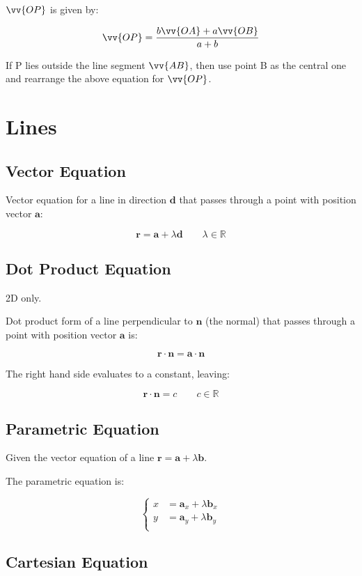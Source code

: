 \documentclass[a4paper,11pt]{article}
\newcommand{\bb}{\boldsymbol}
\begin{document}
$\vv{OP}$ is given by:

$$
\vv{OP} = \frac{b\vv{OA} + a\vv{OB}}{a + b}
$$

If P lies outside the line segment $\vv{AB}$, then use point B as the central
one and rearrange the above equation for $\vv{OP}$.




\section{Lines}

\subsection{Vector Equation}

Vector equation for a line in direction $\bb{d}$ that passes through a point
with position vector $\bb{a}$:

$$
\bb{r} = \bb{a} + \lambda \bb{d} \qquad \lambda \in \mathbb{R}
$$


\subsection{Dot Product Equation}

2D only.

Dot product form of a line perpendicular to $\bb{n}$ (the normal) that passes
through a point with position vector $\bb{a}$ is:

$$
\bb{r} \cdot \bb{n} = \bb{a} \cdot \bb{n}
$$

The right hand side evaluates to a constant, leaving:

$$
\bb{r} \cdot \bb{n} = c \qquad c \in \mathbb{R}
$$


\subsection{Parametric Equation}

Given the vector equation of a line $\bb{r} = \bb{a} + \lambda \bb{b}$.

The parametric equation is:

$$
\begin{cases}
x & = \bb{a}_x + \lambda \bb{b}_x \\
y & = \bb{a}_y + \lambda \bb{b}_y \\
\end{cases}
$$


\subsection{Cartesian Equation}
\end{document}
